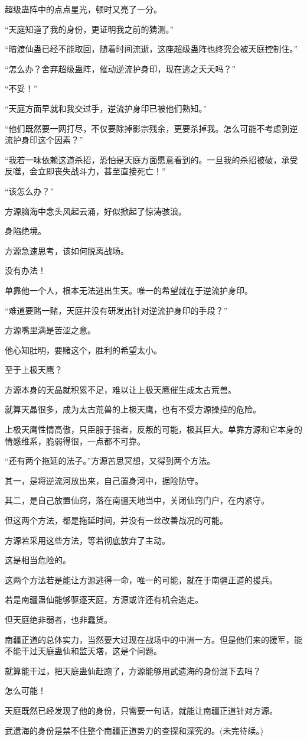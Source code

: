 \begin{this_body}
超级蛊阵中的点点星光，顿时又亮了一分。

“天庭知道了我的身份，更证明我之前的猜测。”

“暗渡仙蛊已经不能取回，随着时间流逝，这座超级蛊阵也终究会被天庭控制住。”

“怎么办？舍弃超级蛊阵，催动逆流护身印，现在逃之夭夭吗？”

“不妥！”

“天庭方面早就和我交过手，逆流护身印已被他们熟知。”

“他们既然要一网打尽，不仅要除掉影宗残余，更要杀掉我。怎么可能不考虑到逆流护身印这个因素？”

“我若一味依赖这道杀招，恐怕是天庭方面愿意看到的。一旦我的杀招被破，承受反噬，会立即丧失战斗力，甚至直接死亡！”

“该怎么办？”

方源脑海中念头风起云涌，好似掀起了惊涛骇浪。

身陷绝境。

方源急速思考，该如何脱离战场。

没有办法！

单靠他一个人，根本无法逃出生天。唯一的希望就在于逆流护身印。

“难道要赌一赌，天庭并没有研发出针对逆流护身印的手段？”

方源嘴里满是苦涩之意。

他心知肚明，要赌这个，胜利的希望太小。

至于上极天鹰？

方源本身的天晶就积累不足，难以让上极天鹰催生成太古荒兽。

就算天晶很多，成为太古荒兽的上极天鹰，也有不受方源操控的危险。

上极天鹰性情高傲，只臣服于强者，反叛的可能，极其巨大。单靠方源和它本身的情感维系，脆弱得很，一点都不可靠。

“还有两个拖延的法子。”方源苦思冥想，又得到两个方法。

其一，是将逆流河放出来，自己置身河中，据险防守。

其二，是自己放置仙窍，落在南疆天地当中，关闭仙窍门户，在内紧守。

但这两个方法，都是拖延时间，并没有一丝改善战况的可能。

方源若采用这些方法，等若彻底放弃了主动。

这是相当危险的。

这两个方法若是能让方源逃得一命，唯一的可能，就在于南疆正道的援兵。

若是南疆蛊仙能够驱逐天庭，方源或许还有机会逃走。

但天庭绝非弱者，也非蠢货。

南疆正道的总体实力，当然要大过现在战场中的中洲一方。但是他们来的援军，能不能干过天庭蛊仙和监天塔，这是个问题。

就算能干过，把天庭蛊仙赶跑了，方源能够用武遗海的身份混下去吗？

怎么可能！

天庭既然已经发现了他的身份，只需要一句话，就能让南疆正道针对方源。

武遗海的身份是禁不住整个南疆正道势力的查探和深究的。(未完待续。)

\end{this_body}

